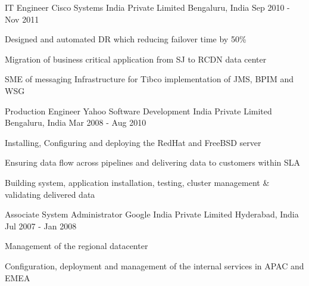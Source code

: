 \begin{cventries}

  \cventry
    {IT Engineer} %
    {Cisco Systems India Private Limited} %
    {Bengaluru, India} %
    {Sep 2010 - Nov 2011} %
    {
      \begin{cvitems} %
        \item {Designed and automated DR which reducing failover time by 50\%}
        \item {Migration of business critical application from SJ to RCDN data center}
        \item {SME of messaging Infrastructure for Tibco implementation of JMS, BPIM and WSG}
      \end{cvitems}
    }


  \cventry
    {Production Engineer} %
    {Yahoo Software Development India Private Limited} %
    {Bengaluru, India} %
    {Mar 2008 - Aug 2010} %
    {
      \begin{cvitems} %
        \item {Installing, Configuring and deploying the RedHat and FreeBSD server}
        \item {Ensuring data flow across pipelines and delivering data to customers within SLA}
        \item {Building system, application installation, testing, cluster management \& validating delivered data}
      \end{cvitems}
    }


  \cventry
    {Associate System Administrator} %
    {Google India Private Limited} %
    {Hyderabad, India} %
    {Jul 2007 - Jan 2008} %
    {
      \begin{cvitems} %
        \item {Management of the regional datacenter}
        \item {Configuration, deployment and management of the internal services in APAC and EMEA}
      \end{cvitems}
    }

\end{cventries}
